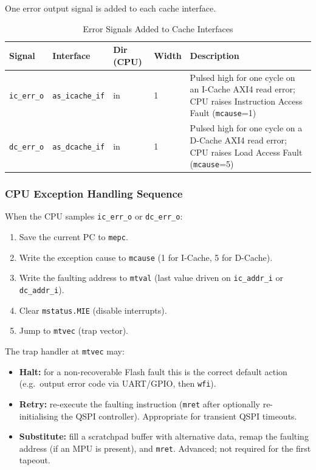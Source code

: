 One error output signal is added to each cache interface.

\begin{table}[H]
\caption{Error Signals Added to Cache Interfaces}
\label{tab:asErrSig}
\centering
\begin{tabularx}{\textwidth}{|l |l |l |l |X|}
  \hline
  Signal & Interface & Dir (CPU) & Width & Description \\
  \hline
  \hline
  \texttt{ic\_err\_o} & \texttt{as\_icache\_if} & in & 1 &
    Pulsed high for one cycle on an I-Cache AXI4 read error;
    CPU raises Instruction Access Fault (\texttt{mcause}=1) \\
  \hline
  \texttt{dc\_err\_o} & \texttt{as\_dcache\_if} & in & 1 &
    Pulsed high for one cycle on a D-Cache AXI4 read error;
    CPU raises Load Access Fault (\texttt{mcause}=5) \\
  \hline
\end{tabularx}
\end{table}

\subsubsection{CPU Exception Handling Sequence}

When the CPU samples \texttt{ic\_err\_o} or \texttt{dc\_err\_o}:

\begin{enumerate}
  \item Save the current PC to \texttt{mepc}.
  \item Write the exception cause to \texttt{mcause}
    (1 for I-Cache, 5 for D-Cache).
  \item Write the faulting address to \texttt{mtval}
    (last value driven on \texttt{ic\_addr\_i} or \texttt{dc\_addr\_i}).
  \item Clear \texttt{mstatus.MIE} (disable interrupts).
  \item Jump to \texttt{mtvec} (trap vector).
\end{enumerate}

The trap handler at \texttt{mtvec} may:

\begin{itemize}
  \item \textbf{Halt:} for a non-recoverable Flash fault this is the
    correct default action (e.g.\ output error code via UART/GPIO,
    then \texttt{wfi}).
  \item \textbf{Retry:} re-execute the faulting instruction
    (\texttt{mret} after optionally re-initialising the QSPI controller).
    Appropriate for transient QSPI timeouts.
  \item \textbf{Substitute:} fill a scratchpad buffer with alternative
    data, remap the faulting address (if an MPU is present), and
    \texttt{mret}.
    Advanced; not required for the first tapeout.
\end{itemize}

